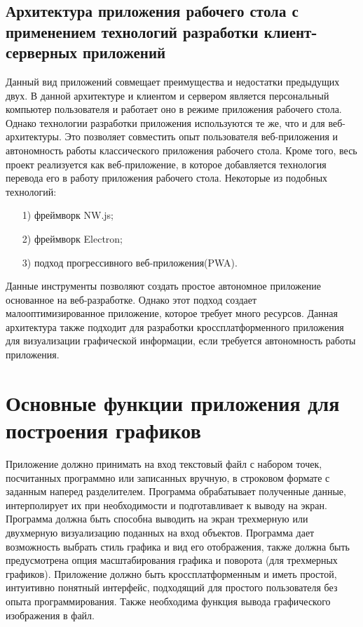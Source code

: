 \subsection{Архитектура приложения рабочего стола с применением технологий разработки клиент-серверных приложений}
Данный вид приложений совмещает преимущества и недостатки предыдущих двух. В данной архитектуре и клиентом и сервером является персональный компьютер пользователя и работает оно в режиме приложения рабочего стола. Однако технологии разработки приложения используются те же, что и для веб-архитектуры. Это позволяет совместить опыт пользователя веб-приложения и автономность работы классического приложения рабочего стола. Кроме того, весь проект реализуется как веб-приложение, в которое добавляется технология перевода его в работу приложения рабочего стола. Некоторые из подобных технологий:
\begin{enumerate}
    \item [1)] фреймворк NW.js;
    \item [2)] фреймворк Electron;
    \item [3)] подход прогрессивного веб-приложения(PWA).
\end{enumerate}
Данные инструменты позволяют создать простое автономное приложение основанное на веб-разработке. Однако этот подход создает малооптимизированное приложение, которое требует много ресурсов. Данная архитектура также подходит для разработки кроссплатформенного приложения для визуализации графической информации, если требуется автономность работы приложения.
\section{Основные функции приложения для построения графиков} %

Приложение должно принимать на вход текстовый файл с набором точек, посчитанных программно или записанных вручную, в строковом формате с заданным наперед разделителем. Программа обрабатывает полученные данные, интерполирует их при необходимости и подготавливает к выводу на экран. Программа должна быть способна выводить на экран трехмерную или двухмерную визуализацию поданных на вход объектов. Программа дает возможность выбрать стиль графика и вид его отображения, также должна быть предусмотрена опция масштабирования графика и поворота (для трехмерных графиков). Приложение должно быть кроссплатформенным и иметь простой, интуитивно понятный интерфейс, подходящий  для простого пользователя без опыта программирования. Также необходима функция вывода графического изображения в файл.


